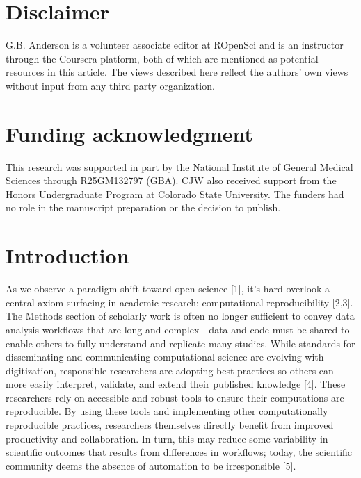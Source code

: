 \documentclass[10pt,letterpaper]{article}
\begin{document}

\linenumbers

\hypertarget{disclaimer}{%
\section{Disclaimer}\label{disclaimer}}

G.B. Anderson is a volunteer associate editor at ROpenSci and is an
instructor through the Coursera platform, both of which are mentioned as
potential resources in this article. The views described here reflect
the authors' own views without input from any third party organization.

\hypertarget{funding-acknowledgment}{%
\section{Funding acknowledgment}\label{funding-acknowledgment}}

This research was supported in part by the National Institute of General
Medical Sciences through R25GM132797 (GBA). CJW also received support
from the Honors Undergraduate Program at Colorado State University. The
funders had no role in the manuscript preparation or the decision to
publish.

\hypertarget{introduction}{%
\section{Introduction}\label{introduction}}

As we observe a paradigm shift toward open science {[}1{]}, it's hard
overlook a central axiom surfacing in academic research: computational
reproducibility {[}2,3{]}. The Methods section of scholarly work is
often no longer sufficient to convey data analysis workflows that are
long and complex---data and code must be shared to enable others to
fully understand and replicate many studies. While standards for
disseminating and communicating computational science are evolving with
digitization, responsible researchers are adopting best practices so
others can more easily interpret, validate, and extend their published
knowledge {[}4{]}. These researchers rely on accessible and robust tools
to ensure their computations are reproducible. By using these tools and
implementing other computationally reproducible practices, researchers
themselves directly benefit from improved productivity and
collaboration. In turn, this may reduce some variability in scientific
outcomes that results from differences in workflows; today, the
scientific community deems the absence of automation to be irresponsible
{[}5{]}.
\end{document}
